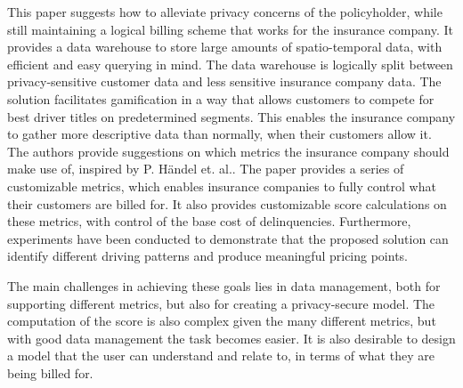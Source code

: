 This paper suggests how to alleviate privacy concerns of the policyholder, while still maintaining a logical billing scheme that works for the insurance company. It provides a data warehouse to store large amounts of spatio-temporal data, with efficient and easy querying in mind. The data warehouse is logically split between privacy-sensitive customer data and less sensitive insurance company data. The solution facilitates gamification in a way that allows customers to compete for best driver titles on predetermined segments. This enables the insurance company to gather more descriptive data than normally, when their customers allow it. The authors provide suggestions on which metrics the insurance company should make use of, inspired by P. Händel et. al.\cite{art:insurtelematics}\cite{art:smartphonemonitor}. The paper provides a series of customizable metrics, which enables insurance companies to fully control what their customers are billed for. It also provides customizable score calculations on these metrics, with control of the base cost of delinquencies. Furthermore, experiments have been conducted to demonstrate that the proposed solution can identify different driving patterns and produce meaningful pricing points.

The main challenges in achieving these goals lies in data management, both for supporting different metrics, but also for creating a privacy-secure model. The computation of the score is also complex given the many different metrics, but with good data management the task becomes easier. It is also desirable to design a model that the user can understand and relate to, in terms of what they are being billed for.